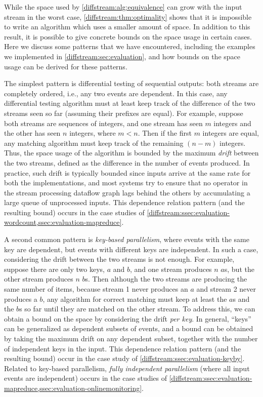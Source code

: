 While the space used by \cref{diffstream:alg:equivalence}  can grow with the input stream in the worst case, \cref{diffstream:thm:optimality} shows that it is impossible to write an algorithm which uses a smaller amount of space. In addition to this result, it is possible to give concrete bounds on the space usage in certain cases. Here we discuss some patterns that we have encountered, including the examples we implemented in \cref{diffstream:sec:evaluation}, and how bounds on the space usage can be derived for these patterns.

The simplest pattern is differential testing of sequential outputs: both streams are completely ordered, i.e., any two events are dependent. In this case, any differential testing algorithm must at least keep track of the difference of the two streams seen so far (assuming their prefixes are equal). For example, suppose both streams are sequences of integers, and one stream has seen $m$ integers and the other has seen $n$ integers, where $m < n$. Then if the first $m$ integers are equal, any matching algorithm must keep track of the remaining $(n - m)$ integers. Thus, the space usage of the algorithm is bounded by the maximum \emph{drift} between the two streams, defined as the difference in the number of events produced.
In practice, such drift is typically bounded since inputs arrive at the same rate for both the implementations, and
most systems try to ensure that no operator in the stream processing dataflow graph lags behind the others by accumulating a large queue of unprocessed inputs.
This dependence relation pattern (and the resulting bound) occurs in the case studies of \cref{diffstream:ssec:evaluation-wordcount,ssec:evaluation-mapreduce}.

A second common pattern is \emph{key-based parallelism}, where events with the same key are dependent, but events with different keys are independent. In such a case, considering the drift between the two streams is not enough. For example, suppose there are only two keys, $a$ and $b$, and one stream produces $n$ $a$s, but the other stream produces $n$ $b$s. Then although the two streams are producing the same number of items, because stream 1 never produces an $a$ and stream 2 never produces a $b$, any algorithm for correct matching must keep at least the $a$s and the $b$s so far until they are matched on the other stream. To address this, we can obtain a bound on the space by considering the drift \emph{per key}. In general, ``keys'' can be generalized as dependent subsets of events, and a bound can be obtained by taking the maximum drift on any dependent subset, together with the number of independent keys in the input. This dependence relation pattern (and the resulting bound) occur in the case study of \cref{diffstream:ssec:evaluation-keyby}.
Related to key-based parallelism, \emph{fully independent parallelism} (where all input events are independent) occurs in the case studies of \cref{diffstream:ssec:evaluation-mapreduce,ssec:evaluation-onlinemonitoring}.

